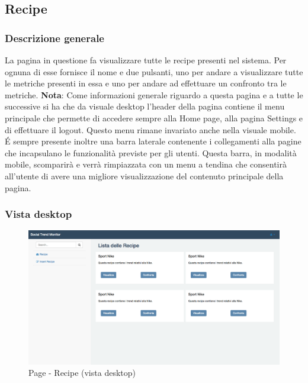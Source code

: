 \clearpage

	\subsection{Recipe} %
	\label{sub:recipe}
		\subsubsection{Descrizione generale} %
		La pagina in questione fa visualizzare tutte le recipe presenti nel sistema. Per ognuna di esse fornisce il nome e due pulsanti, uno per andare a visualizzare tutte le metriche presenti in essa e uno per andare ad effettuare un confronto tra le metriche. \newline
		\textbf{Nota}: Come informazioni generale riguardo a questa pagina e a tutte le successive si ha che da visuale desktop l'header della pagina contiene il menu principale che permette di accedere sempre alla Home page, alla pagina Settings e di effettuare il logout. Questo menu rimane invariato anche nella visuale mobile. \newline
		\'E sempre presente inoltre una barra laterale contenente i collegamenti alla pagine che incapsulano le funzionalità previste per gli utenti. Questa barra, in modalità mobile, scomparirà e verrà rimpiazzata con un menu a tendina che consentirà all'utente di avere una migliore visualizzazione del contenuto principale della pagina.

		\subsubsection{Vista desktop} %
		\begin{figure}[!h]
			\centering
			\centerline{\includegraphics[scale=0.4]{./images/mockup/recipe_vd.pdf}}
			\caption{Page - Recipe (vista desktop)}
		\end{figure}
\clearpage
